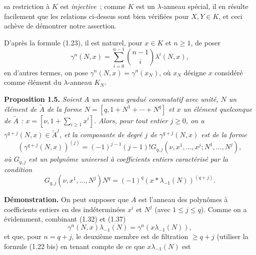 sa
restriction à $K$ est \emph{injective}~; comme $K$ est un $\lambda$-anneau spécial, il en résulte facilement que les relations ci-dessus sont bien vérifiées pour $X,Y\in K$, et ceci achève de démontrer notre assertion.

D'après la formule (1.23), il est naturel, pour $x\in K$ et $n\geq1$, de poser
\begin{equation}\tag{1.37}
\gamma^n(N,x)=\sum_{i=0}^{n-1}\binom{n-1}{i}\lambda^i(N,x),
\end{equation}
en d'autres termes, on pose $\gamma^n(N,x)=\gamma^n(x_N)$, où $x_N$ désigne $x$ considéré comme élément du $\lambda$-anneau $K_N$.

\textbf{Proposition 1.5.} \emph{Soient $A$ un anneau gradué commutatif avec unité, $N$ un élément de $\widetilde A$ de la forme $N=[q,1+N^1+\cdots+N^q]$ et $x$ un élément quelconque de $\widetilde A$ : $x=[\nu,1+\sum_{i\geq1}x^i]$. Alors, pour tout entier $j\geq0$, on a $\gamma^{q+j}(N,x)\in\widetilde A^j$, et la composante de degré $j$ de $\gamma^{q+j}(N,x)$ est de la forme}
\begin{equation}\tag{1.38}
\left(\gamma^{q+j}(N,x)\right)^{(j)}=(-1)^{j-1}(j-1)!G_{q,j}(\nu,x^1,\ldots,x^j;N^1,\ldots,N^j),
\end{equation}
\emph{où $G_{q,j}$ est un polynôme universel à coefficients entiers caractérisé par la condition}
\begin{equation}\tag{1.39}
G_{q,j}(\nu,x^1,\ldots,N^j)N^q=(-1)^q(x*\lambda_{-1}(N))^{(q+j)}.
\end{equation}

\textbf{Démonstration.} On peut supposer que $A$ est l'anneau des polynômes à coefficients entiers en des indéterminées $x^i$ et $N^j$ (avec $1\leq j\leq q$). Comme on a évidemment, combinant (1.32) et (1.37)
\begin{equation}\tag{1.40}
\gamma^n(N,x)\lambda_{-1}(N)=\gamma^n(x\lambda_{-1}(N)),
\end{equation}
et que, pour $n=q+j$, le deuxième membre est de filtration $\geq q+j$ (utiliser la formule (1.22 bis) en tenant compte de ce que $x\lambda_{-1}(N)$ est

